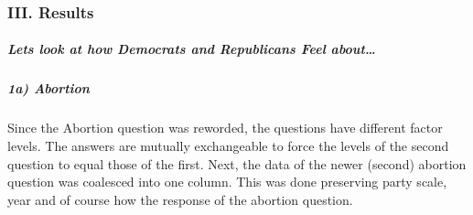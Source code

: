 \documentclass[
]{article}
\newenvironment{Shaded}{\begin{snugshade}}{\end{snugshade}}
\newcommand{\CommentTok}[1]{\textcolor[rgb]{0.56,0.35,0.01}{\textit{#1}}}
\newcommand{\DataTypeTok}[1]{\textcolor[rgb]{0.13,0.29,0.53}{#1}}
\newcommand{\KeywordTok}[1]{\textcolor[rgb]{0.13,0.29,0.53}{\textbf{#1}}}
\newcommand{\NormalTok}[1]{#1}
\newcommand{\OperatorTok}[1]{\textcolor[rgb]{0.81,0.36,0.00}{\textbf{#1}}}
\newcommand{\StringTok}[1]{\textcolor[rgb]{0.31,0.60,0.02}{#1}}
\begin{document}
\begin{Shaded}
\end{Shaded}

\hypertarget{iii.-results}{%
\subsubsection{\texorpdfstring{\textbf{III. Results
}}{III. Results }}\label{iii.-results}}

\hypertarget{lets-look-at-how-democrats-and-republicans-feel-about}{%
\subparagraph{Lets look at how Democrats and Republicans Feel
about\ldots{}}\label{lets-look-at-how-democrats-and-republicans-feel-about}}

\hypertarget{a-abortion}{%
\subparagraph{1a) Abortion}\label{a-abortion}}

Since the Abortion question was reworded, the questions have different
factor levels. The answers are mutually exchangeable to force the levels
of the second question to equal those of the first. Next, the data of
the newer (second) abortion question was coalesced into one column. This
was done preserving party scale, year and of course how the response of
the abortion question.
\end{document}
